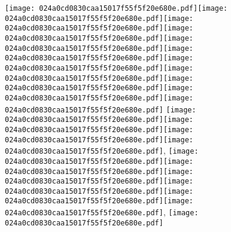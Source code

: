 \documentclass{article}
\newcommand{\origpg}[2]{\texttt{[image: 024a0cd0830caa15017f55f5f20e680e.pdf]}}
\begin{document}
{\vspace{0.405pt}\origpg4{85.303pt 209.87pt 93.373pt 226.01pt}\origpg4{93.47pt 209.87pt 100.64pt 226.01pt}\hspace{-0.178pt}\origpg4{100.46pt 209.87pt 112.89pt 226.01pt}\origpg4{112.97pt 209.87pt 120.13pt 226.01pt}\hspace{-0.178pt}\origpg4{119.96pt 209.87pt 127.01pt 226.01pt}\hspace{-0.307pt}\origpg4{126.7pt 209.87pt 134.77pt 226.01pt}\hspace{-0.597pt}\origpg4{134.18pt 209.87pt 142.29pt 226.01pt}\origpg4{142.34pt 209.87pt 150.98pt 226.01pt}\origpg4{150.98pt 209.87pt 159.05pt 226.01pt}\origpg4{158.97pt 209.87pt 165.58pt 226.01pt}\hspace{-0.597pt}\origpg4{164.99pt 209.87pt 173.06pt 226.01pt} \origpg4{188.1pt 209.87pt 194.72pt 226.01pt}\hspace{-0.113pt}\origpg4{194.6pt 209.87pt 201.77pt 226.01pt}\origpg4{201.82pt 209.87pt 208.19pt 226.01pt}\hspace{-0.113pt}\origpg4{208.08pt 209.87pt 215.25pt 226.01pt}, \origpg4{234.54pt 209.87pt 242.61pt 226.01pt}\hspace{-0.597pt}\origpg4{242.01pt 209.87pt 250.22pt 226.01pt}\origpg4{250.22pt 209.87pt 258.86pt 226.01pt}\origpg4{258.86pt 209.87pt 266.03pt 226.01pt}\hspace{-0.161pt}\origpg4{265.86pt 209.87pt 273.71pt 226.01pt}\hspace{-0.613pt}\origpg4{273.1pt 209.87pt 281.17pt 226.01pt}, \origpg4{300.28pt 209.87pt 307.9pt 226.01pt} 

}
\end{document}
